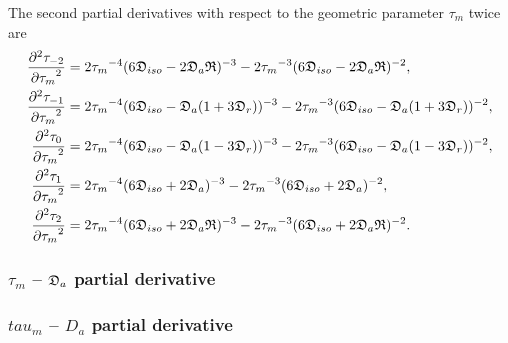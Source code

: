 The second partial derivatives with respect to the geometric parameter $\tau_m$ twice are
\begin{subequations}
\begin{align}
    \frac{\partial^2 \tau_{-2}}{{\partial \tau_m}^2} &= 2{\tau_m}^{-4} (6\mathfrak{D}_{iso} - 2\mathfrak{D}_a\mathfrak{R})^{-3}
        - 2{\tau_m}^{-3} (6\mathfrak{D}_{iso} - 2\mathfrak{D}_a\mathfrak{R})^{-2}, \\
    \frac{\partial^2 \tau_{-1}}{{\partial \tau_m}^2} &= 2{\tau_m}^{-4} (6\mathfrak{D}_{iso} - \mathfrak{D}_a (1 + 3\mathfrak{D}_r))^{-3}
        - 2{\tau_m}^{-3} (6\mathfrak{D}_{iso} - \mathfrak{D}_a (1 + 3\mathfrak{D}_r))^{-2}, \\
    \frac{\partial^2 \tau_{0}}{{\partial \tau_m}^2}  &= 2{\tau_m}^{-4} (6\mathfrak{D}_{iso} - \mathfrak{D}_a (1 - 3\mathfrak{D}_r))^{-3}
        - 2{\tau_m}^{-3} (6\mathfrak{D}_{iso} - \mathfrak{D}_a (1 - 3\mathfrak{D}_r))^{-2}, \\
    \frac{\partial^2 \tau_{1}}{{\partial \tau_m}^2}  &= 2{\tau_m}^{-4} (6\mathfrak{D}_{iso} + 2\mathfrak{D}_a)^{-3}
        - 2{\tau_m}^{-3} (6\mathfrak{D}_{iso} + 2\mathfrak{D}_a)^{-2}, \\
    \frac{\partial^2 \tau_{2}}{{\partial \tau_m}^2}  &= 2{\tau_m}^{-4} (6\mathfrak{D}_{iso} + 2\mathfrak{D}_a\mathfrak{R})^{-3}
        - 2{\tau_m}^{-3} (6\mathfrak{D}_{iso} + 2\mathfrak{D}_a\mathfrak{R})^{-2}.
\end{align}
\end{subequations}



\begin{latexonly}
    \subsubsection{$\tau_m$ -- $\mathfrak{D}_a$ partial derivative}
\end{latexonly}
\begin{htmlonly}
    \subsubsection{$tau_m$ -- $D_a$ partial derivative}
\end{htmlonly}

